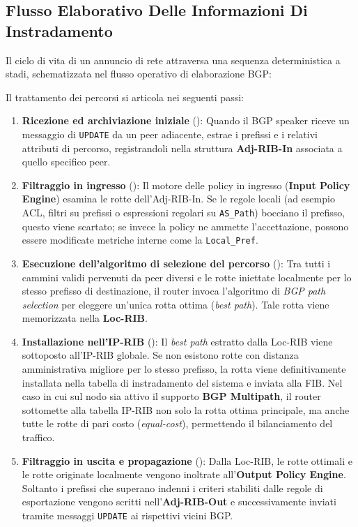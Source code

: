 \documentclass[11pt, a4paper]{article}
\begin{document}
\subsection{Flusso Elaborativo Delle Informazioni Di Instradamento}

Il ciclo di vita di un annuncio di rete attraversa una sequenza deterministica a stadi, schematizzata nel flusso operativo di elaborazione BGP:


Il trattamento dei percorsi si articola nei seguenti passi:
\begin{enumerate}
    \item \textbf{Ricezione ed archiviazione iniziale} (): Quando il BGP speaker riceve un messaggio di \texttt{UPDATE} da un peer adiacente, estrae i prefissi e i relativi attributi di percorso, registrandoli nella struttura \textbf{Adj-RIB-In} associata a quello specifico peer.
    \item \textbf{Filtraggio in ingresso} (): Il motore delle policy in ingresso (\textbf{Input Policy Engine}) esamina le rotte dell'Adj-RIB-In. Se le regole locali (ad esempio ACL, filtri su prefissi o espressioni regolari su \texttt{AS\_Path}) bocciano il prefisso, questo viene scartato; se invece la policy ne ammette l'accettazione, possono essere modificate metriche interne come la \texttt{Local\_Pref}.
    \item \textbf{Esecuzione dell'algoritmo di selezione del percorso} (): Tra tutti i cammini validi pervenuti da peer diversi e le rotte iniettate localmente per lo stesso prefisso di destinazione, il router invoca l'algoritmo di \emph{BGP path selection} per eleggere un'unica rotta ottima (\emph{best path}). Tale rotta viene memorizzata nella \textbf{Loc-RIB}.
    \item \textbf{Installazione nell'IP-RIB} (): Il \emph{best path} estratto dalla Loc-RIB viene sottoposto all'IP-RIB globale. Se non esistono rotte con distanza amministrativa migliore per lo stesso prefisso, la rotta viene definitivamente installata nella tabella di instradamento del sistema e inviata alla FIB. Nel caso in cui sul nodo sia attivo il supporto \textbf{BGP Multipath}, il router sottomette alla tabella IP-RIB non solo la rotta ottima principale, ma anche tutte le rotte di pari costo (\emph{equal-cost}), permettendo il bilanciamento del traffico.
    \item \textbf{Filtraggio in uscita e propagazione} (): Dalla Loc-RIB, le rotte ottimali e le rotte originate localmente vengono inoltrate all'\textbf{Output Policy Engine}. Soltanto i prefissi che superano indenni i criteri stabiliti dalle regole di esportazione vengono scritti nell'\textbf{Adj-RIB-Out} e successivamente inviati tramite messaggi \texttt{UPDATE} ai rispettivi vicini BGP.
\end{enumerate}
\end{document}

